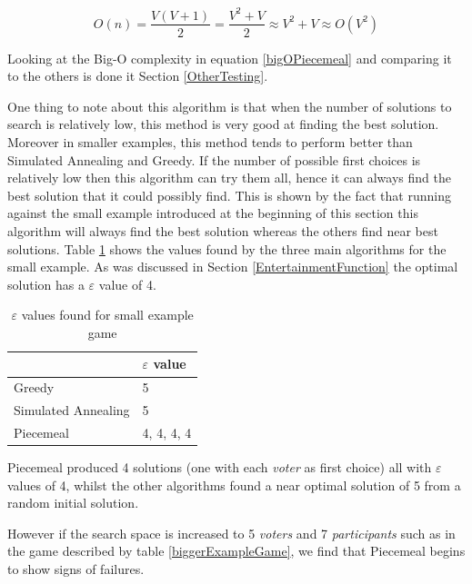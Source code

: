 \documentclass[12pt]{report}
\begin{document}
\begin{equation}\label{bigOPiecemeal}
	O(n) = \frac{V(V+1)}{2} = \frac{V^2 + V}{2} \approx V^2 + V \approx O(V^2)
\end{equation}

Looking at the Big-O complexity in equation \ref{bigOPiecemeal} and comparing it to the others is done it Section \ref{OtherTesting}.

One thing to note about this algorithm is that when the number of solutions to search is relatively low, this method is very good at finding the best solution. Moreover in smaller examples, this method tends to perform better than Simulated Annealing and Greedy. If the number of possible first choices is relatively low then this algorithm can try them all, hence it can always find the best solution that it could possibly find. This is shown by the fact that running against the small example introduced at the beginning of this section this algorithm will always find the best solution whereas the others find near best solutions. Table \ref{smallExampleEs} shows the values found by the three main algorithms for the small example. As was discussed in Section \ref{EntertainmentFunction} the optimal solution has a $\varepsilon$ value of 4.

\begin{table}[H]
\centering
\caption{$\varepsilon$ values found for small example game}
\label{smallExampleEs}
\begin{tabular}{|l|l|}
\hline
                    & $\varepsilon$ value \\ \hline
Greedy              & 5                   \\ \hline
Simulated Annealing & 5                   \\ \hline
Piecemeal           & 4, 4, 4, 4                   \\ \hline
\end{tabular}
\end{table}

Piecemeal produced 4 solutions (one with each \textit{voter} as first choice) all with $\varepsilon$ values of 4, whilst the other algorithms found a near optimal solution of 5 from a random initial solution.

However if the search space is increased to 5 \textit{voters} and 7 \textit{participants} such as in the game described by table \ref{biggerExampleGame}, we find that Piecemeal begins to show signs of failures.
\end{document}
